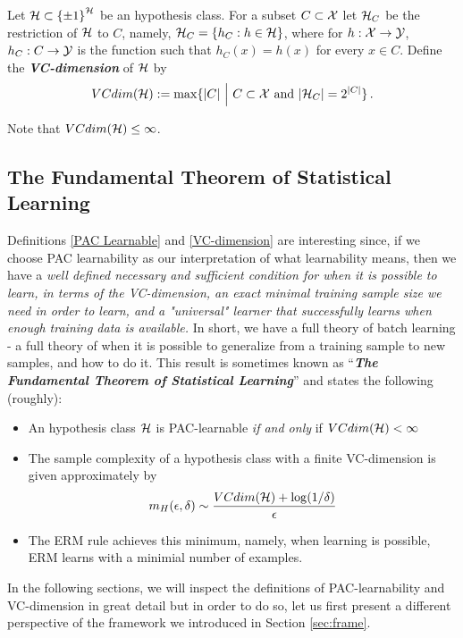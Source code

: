 {\begin{definition} \label{VC-dimension}
	Let $\mathcal{H}\subset\left\{ \pm 1 \right\}^{\mathcal{H}}$ be an hypothesis class.
	For a subset $C\subset \mathcal{X}$ let $\mathcal{H}_C$ be the restriction of $\mathcal{H}$ to $C$, namely,
	$\mathcal{H}_C = \{ h_C : h \in \mathcal{H}\}$, where for $h:\mathcal{X}\to\mathcal{Y}$, $h_C:C\to\mathcal{Y}$ is the
	function such that $h_C(x)=h(x)$ for every $x\in C$. Define the \textbf{\textit{ VC-dimension}} of $\mathcal{H}$ by
	\[
	VCdim(\mathcal{H}) := \max\{ |C| ~\Big|~ C\subset\mathcal{X} \,\,\text{and}\,\, |\mathcal{H}_C|=2^{|C|} \}
	\,.
	\]
	
	Note that $VCdim(\mathcal{H})\leq \infty$. 
\end{definition}


\subsection{The Fundamental Theorem of Statistical Learning}

Definitions \ref{PAC Learnable} and \ref{VC-dimension} are interesting since, if we choose PAC learnability as our
interpretation of what learnability means, then we have a \textit{well defined necessary and sufficient condition for when it is possible to learn, in terms of the VC-dimension,  an exact minimal  training sample size we need in order to learn, and a "universal" learner that successfully learns when enough training data is available.} In short, we have a full theory of batch learning - a full theory of when it is possible to generalize from a training sample to new samples, and how to do it.
\vspace{3mm}
This result is sometimes known as ``\textit{\textbf{The Fundamental Theorem of Statistical Learning}}'' and states the following (roughly):
\begin{itemize}
	\item An hypothesis class $\mathcal{H}$ is PAC-learnable \textit{if and only} if
	$VCdim(\mathcal{H})<\infty$
	\item The sample complexity of a hypothesis class with a finite VC-dimension is
	given approximately by\[
	m_H(\epsilon,\delta) \sim \frac{VCdim(\mathcal{H})+\log(1/\delta)}{\epsilon}
	\]
	\item The ERM rule achieves this minimum, namely, when learning is possible, ERM
	learns with a minimial number of examples.
\end{itemize}

In the following sections, we will inspect the definitions of PAC-learnability and VC-dimension in great detail but in order to do so, let us first  present a different perspective of the framework we introduced in Section \ref{sec:frame}.

}
